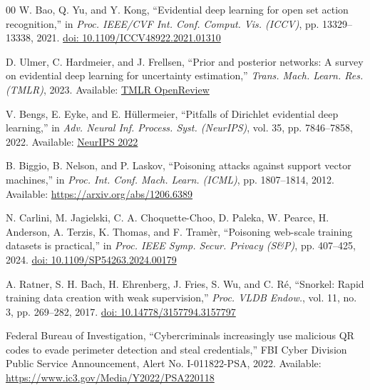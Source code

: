 \documentclass[conference]{IEEEtran}
\begin{document}
\begin{thebibliography}{00}
 W. Bao, Q. Yu, and Y. Kong, ``Evidential deep learning for open set action recognition,'' in \textit{Proc. IEEE/CVF Int. Conf. Comput. Vis. (ICCV)}, pp. 13329--13338, 2021. \href{https://doi.org/10.1109/ICCV48922.2021.01310}{doi: 10.1109/ICCV48922.2021.01310}

 D. Ulmer, C. Hardmeier, and J. Frellsen, ``Prior and posterior networks: A survey on evidential deep learning for uncertainty estimation,'' \textit{Trans. Mach. Learn. Res. (TMLR)}, 2023. Available: \href{https://openreview.net/forum?id=s6eGZkWqgC}{TMLR OpenReview}

 V. Bengs, E. Eyke, and E. H{\"u}llermeier, ``Pitfalls of Dirichlet evidential deep learning,'' in \textit{Adv. Neural Inf. Process. Syst. (NeurIPS)}, vol. 35, pp. 7846--7858, 2022. Available: \href{https://proceedings.neurips.cc/paper_files/paper/2022/hash/3497d5bfa4e3c35b54a2dd80c3ba9fd4-Abstract-Conference.html}{NeurIPS 2022}

 B. Biggio, B. Nelson, and P. Laskov, ``Poisoning attacks against support vector machines,'' in \textit{Proc. Int. Conf. Mach. Learn. (ICML)}, pp. 1807--1814, 2012. Available: \href{https://arxiv.org/abs/1206.6389}{https://arxiv.org/abs/1206.6389}

 N. Carlini, M. Jagielski, C. A. Choquette-Choo, D. Paleka, W. Pearce, H. Anderson, A. Terzis, K. Thomas, and F. Tram{\`e}r, ``Poisoning web-scale training datasets is practical,'' in \textit{Proc. IEEE Symp. Secur. Privacy (S\&P)}, pp. 407--425, 2024. \href{https://doi.org/10.1109/SP54263.2024.00179}{doi: 10.1109/SP54263.2024.00179}

 A. Ratner, S. H. Bach, H. Ehrenberg, J. Fries, S. Wu, and C. R{\'e}, ``Snorkel: Rapid training data creation with weak supervision,'' \textit{Proc. VLDB Endow.}, vol. 11, no. 3, pp. 269--282, 2017. \href{https://doi.org/10.14778/3157794.3157797}{doi: 10.14778/3157794.3157797}

 Federal Bureau of Investigation, ``Cybercriminals increasingly use malicious QR codes to evade perimeter detection and steal credentials,'' FBI Cyber Division Public Service Announcement, Alert No. I-011822-PSA, 2022. Available: \href{https://www.ic3.gov/Media/Y2022/PSA220118}{https://www.ic3.gov/Media/Y2022/PSA220118}
\end{thebibliography}
\end{document}
